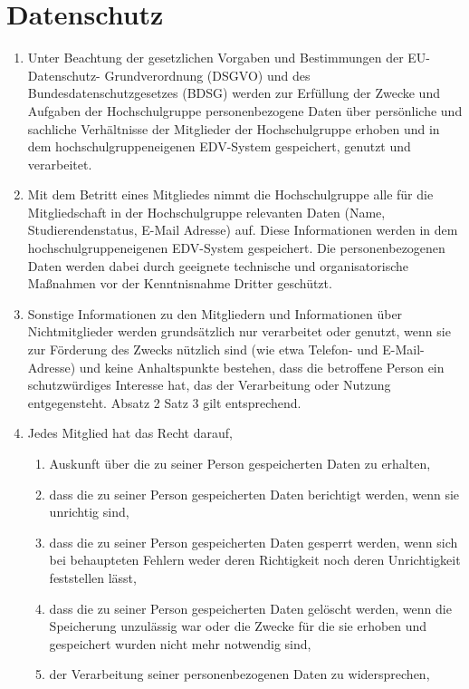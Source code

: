 \documentclass[11pt]{article}
\begin{document}
\section{Datenschutz}
\begin{enumerate}
	\item Unter Beachtung der gesetzlichen Vorgaben und Bestimmungen der EU-Datenschutz-
	      Grundverordnung (DSGVO) und des Bundesdatenschutzgesetzes (BDSG) werden zur Erfüllung
	      der Zwecke und Aufgaben der Hochschulgruppe personenbezogene Daten über persönliche und
	      sachliche Verhältnisse der Mitglieder der Hochschulgruppe erhoben und in dem
	      hochschulgruppeneigenen EDV-System gespeichert, genutzt und verarbeitet.
	\item Mit dem Betritt eines Mitgliedes nimmt die Hochschulgruppe alle für die Mitgliedschaft in der
	      Hochschulgruppe relevanten Daten (Name, Studierendenstatus, E-Mail Adresse) auf. Diese Informationen
	      werden in dem hochschulgruppeneigenen EDV-System gespeichert. Die personenbezogenen
	      Daten werden dabei durch geeignete technische und organisatorische Maßnahmen vor der
	      Kenntnisnahme Dritter geschützt.
	\item Sonstige Informationen zu den Mitgliedern und Informationen über Nichtmitglieder werden
	      grundsätzlich nur verarbeitet oder genutzt, wenn sie zur Förderung des Zwecks nützlich sind
	      (wie etwa Telefon- und E-Mail-Adresse) und keine Anhaltspunkte bestehen, dass die betroffene
	      Person ein schutzwürdiges Interesse hat, das der Verarbeitung oder Nutzung entgegensteht.
	      Absatz 2 Satz 3 gilt entsprechend.
	\item Jedes Mitglied hat das Recht darauf,
	      \begin{enumerate}
		      \item Auskunft über die zu seiner Person gespeicherten Daten zu erhalten,
		      \item dass die zu seiner Person gespeicherten Daten berichtigt werden, wenn sie unrichtig sind,
		      \item dass die zu seiner Person gespeicherten Daten gesperrt werden, wenn sich bei behaupteten
		            Fehlern weder deren Richtigkeit noch deren Unrichtigkeit feststellen lässt,
		      \item dass die zu seiner Person gespeicherten Daten gelöscht werden, wenn die Speicherung
		            unzulässig war oder die Zwecke für die sie erhoben und gespeichert wurden nicht mehr
		            notwendig sind,
		      \item der Verarbeitung seiner personenbezogenen Daten zu widersprechen,

\end{enumerate}
\end{enumerate}
\end{document}
